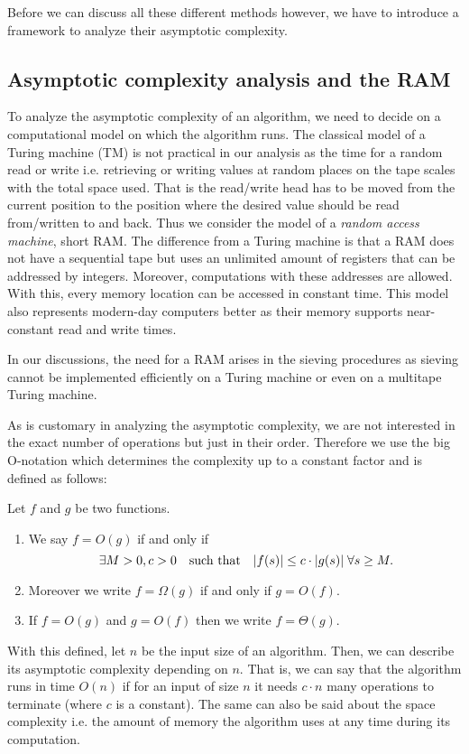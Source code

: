 Before we can discuss all these different methods however, we have to introduce a framework to analyze their asymptotic complexity.

\subsection{Asymptotic complexity analysis and the RAM}
To analyze the asymptotic complexity of an algorithm, we need to decide on a computational model on which the algorithm runs.
The classical model of a Turing machine (TM) is not practical in our analysis as the time for a random read or write i.e.
retrieving or writing values at random places on the tape scales with the total space used.
That is the read/write head has to be moved from the current position to the position where the desired value should be read from/written to and back.
Thus we consider the model of a \emph{random access machine}, short RAM.
The difference from a Turing machine is that a RAM does not have a sequential tape but uses
an unlimited amount of registers that can be addressed by integers. Moreover, computations with these addresses are allowed.
With this, every memory location can be accessed in constant time. This model also represents modern-day computers better as their
memory supports near-constant read and write times.

In our discussions, the need for a RAM arises in the sieving procedures as sieving cannot be implemented
efficiently on a Turing machine or even on a multitape Turing machine.

As is customary in analyzing the asymptotic complexity, we are not interested in the exact
number of operations but just in their order. Therefore we use the big O-notation
which determines the complexity up to a constant factor and is defined as follows:
\begin{definition}
	Let $f$ and $g$ be two functions.
	\begin{enumerate}
		\item We say $f = O(g)$ if and only if
			\[
				\exists M > 0, c > 0 \qq{such that} \abs{f(s)} \leq c \cdot  \abs{g(s)} \forall s \geq M
			.\] 
		\item Moreover we write $f = \Omega(g)$ if and only if $g = O(f)$. 
		\item If $f = O(g)$ and $g = O(f)$ then we write $f = \Theta(g)$.
	\end{enumerate}
\end{definition}
With this defined, let $n$ be the input size of an algorithm.
Then, we can describe its asymptotic complexity depending on $n$. 
That is, we can say that the algorithm runs in time $O(n)$ if for an input of size $n$ it needs
$c \cdot n$ many operations to terminate (where $c$ is a constant).
The same can also be said about the space complexity i.e. the amount of memory the algorithm uses at any time during its computation.

